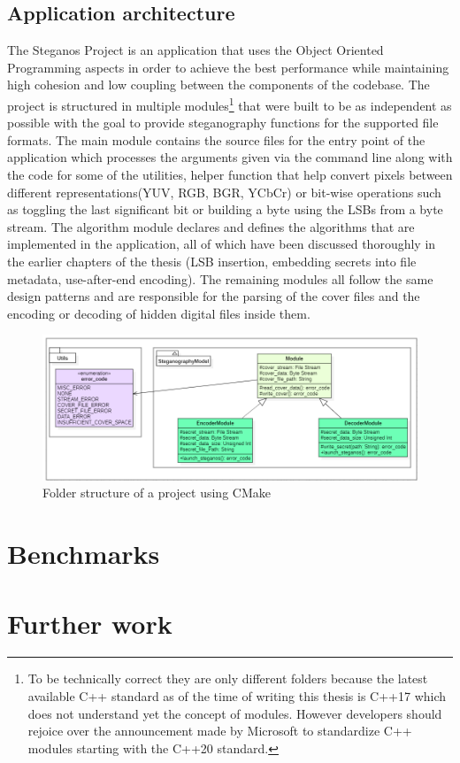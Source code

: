 \begin{multicols}{2}
\section{Application architecture}
The Steganos Project is an application that uses the Object Oriented Programming aspects in order to achieve the best performance while maintaining high cohesion and low coupling between the components of the codebase. The project is structured in multiple modules\footnote{To be technically correct they are only different folders because the latest available C++ standard as of the time of writing this thesis is C++17 which does not understand yet the concept of modules. However developers should rejoice over the announcement made by Microsoft to standardize C++ modules starting with the C++20 standard\cite{N4720}.} that were built to be as independent as possible with the goal to provide steganography functions for the supported file formats. The main module contains the source files for the entry point of the application which processes the arguments given via the command line along with the code for some of the utilities, helper function that help convert pixels between different representations(YUV, RGB, BGR, YCbCr) or bit-wise operations such as toggling the last significant bit or building a byte using the LSBs from a byte stream. The algorithm module declares and defines the algorithms that are implemented in the application, all of which have been discussed thoroughly in the earlier chapters of the thesis (LSB insertion, embedding secrets into file metadata, use-after-end encoding). The remaining modules all follow the same design patterns and are responsible for the parsing of the cover files and the encoding or decoding of hidden digital files inside them. 

\end{multicols}

\begin{figure}[H]
    \centering
    \includegraphics[width=17cm,keepaspectratio]{pics/application_chapter/diagrama_module_interface}
    \caption{Folder structure of a project using CMake}
\end{figure}

\begin{multicols*}{2}
\section{Benchmarks}

\section{Further work}
\end{multicols*}